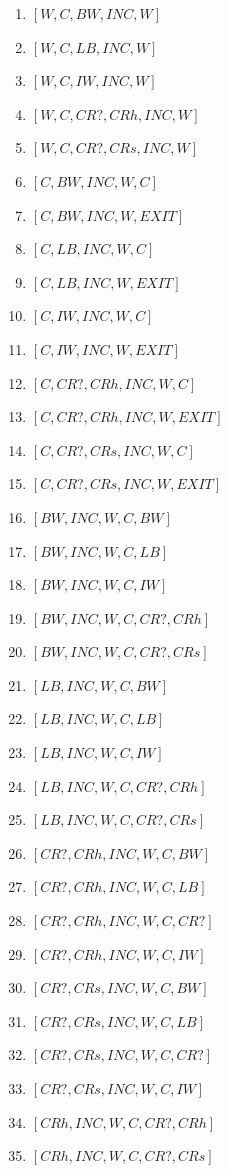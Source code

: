 \documentclass[12pt,a4paper]{article}
\begin{document}
\begin{enumerate}
  \item $[W, C, BW, INC, W]$
  \item $[W, C, LB, INC, W]$
  \item $[W, C, IW, INC, W]$
  \item $[W, C, CR?, CRh, INC, W]$
  \item $[W, C, CR?, CRs, INC, W]$
  \item $[C, BW, INC, W, C]$
  \item $[C, BW, INC, W, EXIT]$
  \item $[C, LB, INC, W, C]$
  \item $[C, LB, INC, W, EXIT]$
  \item $[C, IW, INC, W, C]$
  \item $[C, IW, INC, W, EXIT]$
  \item $[C, CR?, CRh, INC, W, C]$
  \item $[C, CR?, CRh, INC, W, EXIT]$
  \item $[C, CR?, CRs, INC, W, C]$
  \item $[C, CR?, CRs, INC, W, EXIT]$
  \item $[BW, INC, W, C, BW]$
  \item $[BW, INC, W, C, LB]$
  \item $[BW, INC, W, C, IW]$
  \item $[BW, INC, W, C, CR?, CRh]$
  \item $[BW, INC, W, C, CR?, CRs]$
  \item $[LB, INC, W, C, BW]$
  \item $[LB, INC, W, C, LB]$
  \item $[LB, INC, W, C, IW]$
  \item $[LB, INC, W, C, CR?, CRh]$
  \item $[LB, INC, W, C, CR?, CRs]$
  \item $[CR?, CRh, INC, W, C, BW]$
  \item $[CR?, CRh, INC, W, C, LB]$
  \item $[CR?, CRh, INC, W, C, CR?]$
  \item $[CR?, CRh, INC, W, C, IW]$
  \item $[CR?, CRs, INC, W, C, BW]$
  \item $[CR?, CRs, INC, W, C, LB]$
  \item $[CR?, CRs, INC, W, C, CR?]$
  \item $[CR?, CRs, INC, W, C, IW]$
  \item $[CRh, INC, W, C, CR?, CRh]$
  \item $[CRh, INC, W, C, CR?, CRs]$

\end{enumerate}
\end{document}
